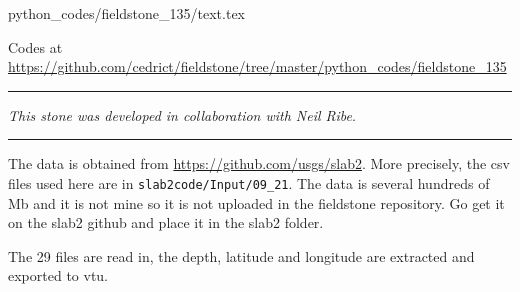 \begin{flushright} {\tiny {\color{gray} python\_codes/fieldstone\_135/text.tex}} \end{flushright}

%

\begin{center}
\inpython Codes at \url{https://github.com/cedrict/fieldstone/tree/master/python_codes/fieldstone_135}
\end{center}

\par\noindent\rule{\textwidth}{0.4pt}

{\sl This stone was developed in collaboration with Neil Ribe}. 

\par\noindent\rule{\textwidth}{0.4pt}

The data is obtained from \url{https://github.com/usgs/slab2}. More precisely,
the csv files used here are in {\tt slab2code/Input/09\_21}. The data is several hundreds of Mb
and it is not mine so it is not uploaded in the fieldstone repository. Go get 
it on the slab2 github and place it in the slab2 folder.

The 29 files are read in, the depth, latitude and longitude are extracted and exported
to vtu. 

